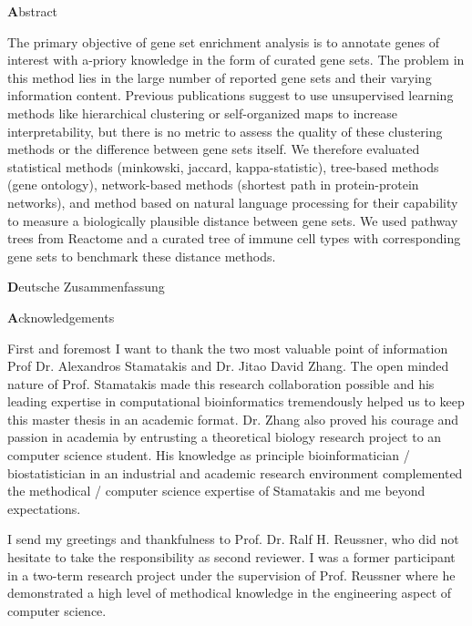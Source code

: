 \documentclass{thesisclass}
\begin{document}
\begin{addmargin}{0.5cm}

\centerline{\textbf Abstract}

The primary objective of gene set enrichment analysis is to annotate genes of interest with a-priory knowledge in the form of curated gene sets. The problem in this method lies in the large number of reported gene sets and their varying information content. Previous publications suggest to use unsupervised learning methods like hierarchical clustering or self-organized maps to increase interpretability, but there is no metric to assess the quality of these clustering methods or the difference between gene sets itself. We therefore evaluated statistical methods (minkowski, jaccard, kappa-statistic), tree-based methods (gene ontology), network-based methods (shortest path in protein-protein networks), and method based on natural language processing for their capability to measure a biologically plausible distance between gene sets. We used pathway trees from Reactome and a curated tree of immune cell types with corresponding gene sets to benchmark these distance methods.  

\vskip 2cm

\centerline{\textbf Deutsche Zusammenfassung}



\vskip 2cm

\newpage

\centerline{\textbf Acknowledgements}

First and foremost I want to thank the two most valuable point of information Prof Dr. Alexandros Stamatakis and Dr. Jitao David Zhang. The open minded nature of Prof. Stamatakis made this research collaboration possible and his leading expertise in computational bioinformatics tremendously helped us to keep this master thesis in an academic format. Dr. Zhang also proved his courage and passion in academia by entrusting a theoretical biology research project to an computer science student. His knowledge as principle bioinformatician / biostatistician in an industrial and academic research environment complemented the methodical / computer science expertise of Stamatakis and me beyond expectations.

I send my greetings and thankfulness to Prof. Dr. Ralf H. Reussner, who did not hesitate to take the responsibility as second reviewer. I was a former participant in a two-term research project under the supervision of Prof. Reussner where he demonstrated a high level of methodical knowledge in the engineering aspect of computer science. 


\end{addmargin}
\end{document}
